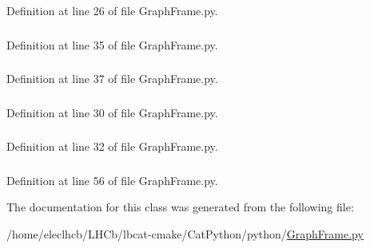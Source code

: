 Definition at line 26 of file GraphFrame.py.\hypertarget{classGraphFrame_1_1GraphFrame_a466fa275a58f14b3ad3ed7ab0f3e1556}{
\subsubsection[{panel}]{}}
\label{classGraphFrame_1_1GraphFrame_a466fa275a58f14b3ad3ed7ab0f3e1556}


Definition at line 35 of file GraphFrame.py.\hypertarget{classGraphFrame_1_1GraphFrame_a0e2de5fb8e5adda2912b5070b8389daa}{
\subsubsection[{panels}]{}}
\label{classGraphFrame_1_1GraphFrame_a0e2de5fb8e5adda2912b5070b8389daa}


Definition at line 37 of file GraphFrame.py.\hypertarget{classGraphFrame_1_1GraphFrame_af4d6ec7c5827c044e824a382bbcf6d6b}{
\subsubsection[{parent}]{}}
\label{classGraphFrame_1_1GraphFrame_af4d6ec7c5827c044e824a382bbcf6d6b}


Definition at line 30 of file GraphFrame.py.\hypertarget{classGraphFrame_1_1GraphFrame_ac980711b701a76e8fa25effaf24b8b6a}{
\subsubsection[{path}]{}}
\label{classGraphFrame_1_1GraphFrame_ac980711b701a76e8fa25effaf24b8b6a}


Definition at line 32 of file GraphFrame.py.\hypertarget{classGraphFrame_1_1GraphFrame_acbab8fe314e74a682d7c3603ae51c615}{
\subsubsection[{toolBar}]{}}
\label{classGraphFrame_1_1GraphFrame_acbab8fe314e74a682d7c3603ae51c615}


Definition at line 56 of file GraphFrame.py.

The documentation for this class was generated from the following file:\begin{DoxyCompactItemize}
\item 
/home/eleclhcb/LHCb/lbcat-\/cmake/CatPython/python/\hyperlink{GraphFrame_8py}{GraphFrame.py}\end{DoxyCompactItemize}
